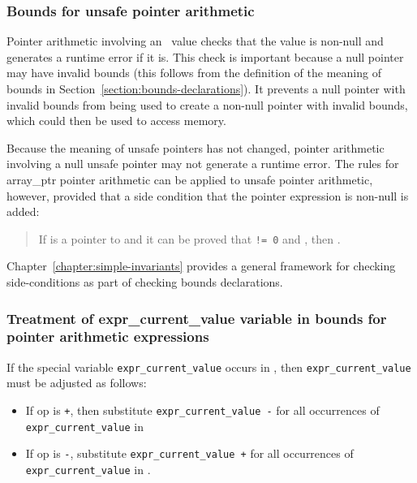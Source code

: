 \subsubsection{Bounds for unsafe pointer arithmetic}
\label{bounds-for-unsafe-pointer-arithmetic}

Pointer arithmetic involving an \arrayptr\ value checks that
the value is non-null and generates a runtime error if it is. This check
is important because a null pointer may have invalid bounds (this
follows from the definition of the meaning of bounds in 
Section~\ref{section:bounds-declarations}). It
prevents a null pointer with invalid bounds from being used to create a
non-null pointer with invalid bounds, which could then be used to access
memory.

Because the meaning of unsafe pointers has not changed, pointer
arithmetic involving a null unsafe pointer may not generate a runtime
error. The rules for array\_ptr pointer arithmetic can be applied to
unsafe pointer arithmetic, however, provided that a side condition that
the pointer expression is non-null is added:

\begin{quote}
If  is a pointer to  and it can be proved that
 \texttt{!= 0} and 
, then
.
\end{quote}

Chapter~\ref{chapter:simple-invariants}
provides a general framework for checking side-conditions as
part of checking bounds declarations.

\subsubsection{Treatment of expr\_current\_value variable in bounds for
pointer arithmetic
expressions}\label{treatment-of-exprux5fcurrentux5fvalue-variable-in-bounds-for-pointer-arithmetic-expressions}

If the special variable \texttt{expr\_current\_value} occurs in
, then
\texttt{expr\_current\_value} must be adjusted as follows:

\begin{itemize}
\item
  If op is \texttt{+}, then substitute \texttt{expr\_current\_value -}
   for all occurrences of \texttt{expr\_current\_value} in
\item
  If op is \texttt{-}, substitute \texttt{expr\_current\_value +}
   for all occurrences of \texttt{expr\_current\_value} in
  .
\end{itemize}

